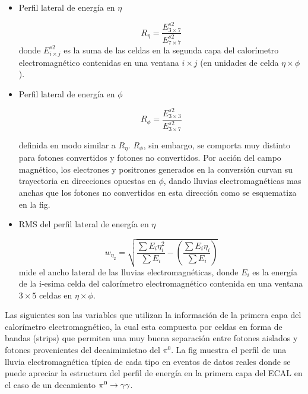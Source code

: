 \begin{itemize}\itemsep0.2cm\parskip0.2cm
\item Perfil lateral de energía en $\eta$

  \begin{equation}
    R_\eta = \frac{E^{s2}_{3\times 7}}{E^{s2}_{7\times 7}}
  \end{equation}
%
  donde $E^{s2}_{i\times j}$ es la suma de las celdas en la segunda capa del calorímetro
  electromagnético contenidas en una ventana $i \times j$ (en unidades de celda $\eta \times \phi$).

\item Perfil lateral de energía en $\phi$

  \begin{equation}
    R_\phi = \frac{E^{s2}_{3\times 3}}{E^{s2}_{3\times 7}}
  \end{equation}

  definida en modo similar a $R_\eta$.
  $R_\phi$, sin embargo, se comporta muy distinto para fotones convertidos y
  fotones no convertidos. Por acción del campo magnético, los electrones y positrones
  generados en la conversión curvan su trayectoria en direcciones opuestas en $\phi$,
  dando lluvias electromagnéticas mas anchas que los fotones no convertidos en esta dirección
  como se esquematiza en la fig.


  \item RMS del perfil lateral de energía en $\eta$

  \begin{equation}
    w_{\eta_2} = \sqrt{ \frac{\sum E_i \eta_i^2}{\sum E_i} - \left( \frac{\sum E_i \eta_i}{\sum E_i} \right) }
  \end{equation}
  mide el ancho lateral de las lluvias electromagnéticas, donde $E_i$ es la energía de la i-esima celda del
  calorímetro electromagnético contenida en una ventana $3 \times 5$ celdas en $\eta \times \phi$.
\end{itemize}

Las siguientes son las variables que utilizan la información de la primera capa
del calorímetro electromagnético, la cual esta compuesta por celdas en forma de
bandas (strips) que permiten una muy buena separación entre fotones aislados y
fotones provenientes del decaimimietno del $\pi^0$. La fig muestra el perfil de
una lluvia electromagnética típica de cada tipo en eventos de datos reales donde
se puede apreciar la estructura del perfil de energía en la primera capa del
ECAL en el caso de un decamiento $\pi^0 \to \gam\gam$.

